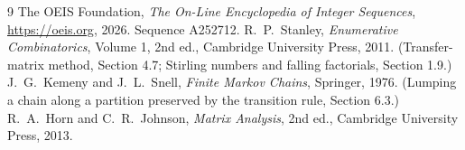 \documentclass[11pt,a4paper]{article}
\theoremstyle{plain}
\theoremstyle{definition}
\begin{document}
\begin{thebibliography}{9}
 The OEIS Foundation, \emph{The On-Line Encyclopedia of Integer
Sequences}, \url{https://oeis.org}, 2026. Sequence A252712.
 R.~P.~Stanley, \emph{Enumerative Combinatorics}, Volume 1, 2nd ed.,
Cambridge University Press, 2011. (Transfer-matrix method, Section 4.7; Stirling numbers and
falling factorials, Section 1.9.)
 J.~G.~Kemeny and J.~L.~Snell, \emph{Finite Markov Chains}, Springer,
1976. (Lumping a chain along a partition preserved by the transition rule, Section 6.3.)
 R.~A.~Horn and C.~R.~Johnson, \emph{Matrix Analysis}, 2nd ed., Cambridge
University Press, 2013.
\end{thebibliography}
\end{document}
